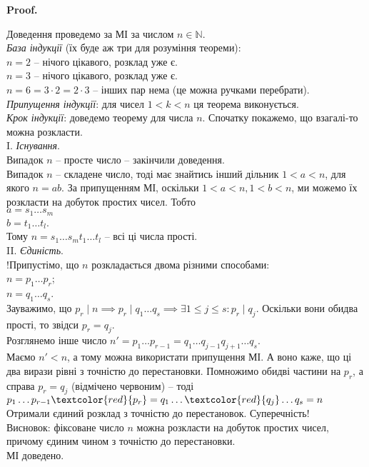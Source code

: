 \documentclass[a4paper, 14pt]{extarticle}
\makeatletter
\theoremstyle{theoremdd}
\theoremstyle{theoremdd}
\theoremstyle{theoremdd}
\theoremstyle{theoremdd}
\theoremstyle{theoremdd}
\theoremstyle{theoremdd}
\theoremstyle{theoremdd}
\theoremstyle{theoremdd}
\def\qed{$\blacksquare$}
\renewenvironment{proof}[1][Proof.\\]{\par
\pushQED{\hfill \qed}%
\normalfont \topsep6\p@\@plus6\p@\relax
\trivlist
\item\relax
{\bfseries
#1\@addpunct{.}}\hspace\labelsep\ignorespaces
}{%
\popQED\endtrivlist\@endpefalse
}
\makeatother
\begin{document}
\begin{proof}
Доведення проведемо за МІ за числом $n \in \mathbb{N}$.\\
\textit{База індукції} (їх буде аж три для розуміння теореми): \\
$n = 2$ -- нічого цікавого, розклад уже є.\\
$n = 3$ -- нічого цікавого, розклад уже є.\\
$n = 6 = 3 \cdot 2 = 2 \cdot 3$ -- інших пар нема (це можна ручками перебрати).\\
\textit{Припущення індукції}: для чисел $1 < k < n$ ця теорема виконується.\\
\textit{Крок індукції}: доведемо теорему для числа $n$. Спочатку покажемо, що взагалі-то можна розкласти.
\bigskip \\
I. \textit{Існування}.\\
Випадок $n$ -- просте число -- закінчили доведення.\\
Випадок $n$ -- складене число, тоді має знайтись інший дільник $1 < a < n$, для якого $n = ab$. За припущенням МІ, оскільки $1 < a < n, 1 < b < n$, ми можемо їх розкласти на добуток простих чисел. Тобто\\
$a = s_1 \dots s_m$\\
$b = t_1 \dots t_l$.\\
Тому $n = s_1 \dots s_m t_1 \dots t_l$ -- всі ці числа прості.
\bigskip \\
II. \textit{Єдиність}. \\
!Припустімо, що $n$ розкладається двома різними способами:\\
$n = p_1 \dots p_r$;\\
$n = q_1 \dots q_s$.\\
Зауважимо, що $p_r \mid n \implies p_r \mid q_1 \dots q_s \implies \exists 1 \leq j \leq s: p_r \mid q_j$. Оскільки вони обидва прості, то звідси $p_r = q_j$.\\
Розглянемо інше число $n' = p_1 \dots p_{r-1} = q_1 \dots q_{j-1} q_{j+1} \dots q_s$.\\
Маємо $n' < n$, а тому можна використати припущення МІ. А воно каже, що ці два вирази рівні з точністю до перестановки. Помножимо обидві частини на $p_r$, а справа $p_r = q_j$ (відмічено червоним) -- тоді\\
$p_1 \dots p_{r-1} \textcolor{red}{p_r} = q_1 \dots \textcolor{red}{q_j} \dots q_s = n$\\
Отримали єдиний розклад з точністю до перестановок. Суперечність!\\
Висновок: фіксоване число $n$ можна розкласти на добуток простих чисел, причому єдиним чином з точністю до перестановки.\\
МІ доведено.
\end{proof}
\end{document}
